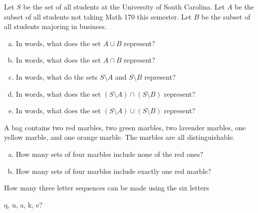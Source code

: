\documentclass[12pt]{amsart}
\begin{document}
\begin{thm}[10 Points]\label{ex1}
  Let $S$ be the set of all students at the University of South Carolina.
  Let $A$ be the subset of all students not taking Math 170 this semester.
  Let $B$ be the subset of all students majoring in business.
  \begin{enumerate}[(a)]
  \item
    In words, what does the set $A \cup B$ represent?
    \vspace{1.5in}
  \item
    In words, what does the set $A \cap B$ represent?
    \vspace{1.5in}
  \item
    In words, what do the sets $S \setminus A$ and $S \setminus B$ represent?
    \vspace{1.5in}
  \item
    In words, what does the set $\left(S \setminus A\right) \cap \left(S \setminus B\right)$ represent?
    \vspace{1.5in}
  \item
    In words, what does the set $\left(S \setminus A\right) \cup \left(S \setminus B\right)$ represent?
  \end{enumerate}
  
\end{thm}

\newpage
\begin{thm}[20 Points]\label{ex2}
  A bag contains two red marbles, two green marbles, two lavender marbles, one yellow marble, and one orange marble.
  The marbles are all distinguishable.
  \begin{enumerate}[(a)]
  \item
    How many sets of four marbles include none of the red ones?
    \vspace{4in}
  \item
    How many sets of four marbles include exactly one red marble?
  \end{enumerate}  
\end{thm}

\newpage

\begin{thm}[12 Points]\label{ex3}
  How many three letter sequences can be made using the six letters 
  \begin{center}q, u, a, k, e?\end{center}
\end{thm}

\newpage
\end{document}
